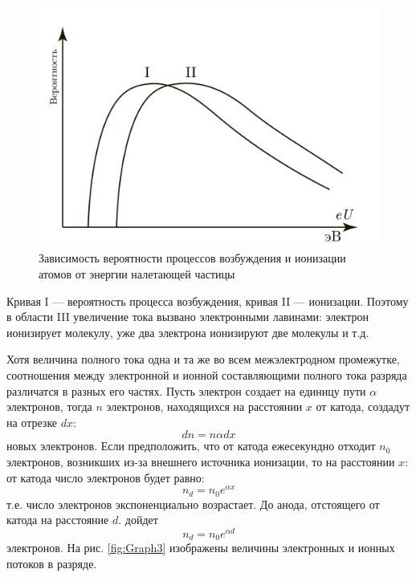 \documentclass[a4paper, 12pt]{article}
\begin{document}
\begin{figure}[h]
\centering
\includegraphics[scale = 0.4]{Graph2.pdf}
\caption{Зависимость вероятности процессов возбуждения и ионизации атомов от энергии налетающей частицы}
\label{fig:Graph2}
\end{figure}
Кривая I — вероятность процесса возбуждения, кривая II — ионизации. Поэтому в области III увеличение тока вызвано электронными лавинами: электрон ионизирует молекулу, уже два электрона ионизируют две молекулы и т.д.\par
Хотя величина полного тока одна и та же во всем межэлектродном промежутке, соотношения между электронной и ионной составляющими полного тока разряда различатся в разных его частях. Пусть электрон создает на единицу пути $\alpha$ электронов, тогда $n$ электронов, находящихся на расстоянии $x$ от катода, создадут на отрезке $dx$:
\begin{equation}
dn=n\alpha dx
\end{equation}
новых электронов. Если предположить, что от катода ежесекундно отходит $n_0$ электронов, возникших из-за внешнего источника ионизации, то на расстоянии $x$: от катода число электронов будет равно:
\begin{equation}
n_d=n_0e^{\alpha x}
\end{equation}
т.е. число электронов  экспоненциально возрастает. До анода, отстоящего от катода на расстояние $d$. дойдет
\begin{equation}
n_d=n_0e^{\alpha d}
\end{equation}
электронов. На рис. \ref{fig:Graph3} изображены величины электронных и ионных потоков в разряде.\par
\end{document}
